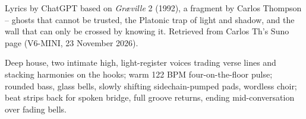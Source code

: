 
\begin{notes}
Lyrics by ChatGPT based on \emph{Gr\ae ville} 2 (1992), a fragment by Carlos Thompson -- ghosts that cannot be trusted, the Platonic trap of light and shadow, and the wall that can only be crossed by knowing it. Retrieved from Carlos Th's Suno page (V6-MINI, 23 November 2026).
\end{notes}
\begin{style}
Deep house, two intimate high, light-register voices trading verse lines and stacking harmonies on the hooks; warm 122 BPM four-on-the-floor pulse; rounded bass, glass bells, slowly shifting sidechain-pumped pads, wordless choir; beat strips back for spoken bridge, full groove returns, ending mid-conversation over fading bells.
\end{style}
